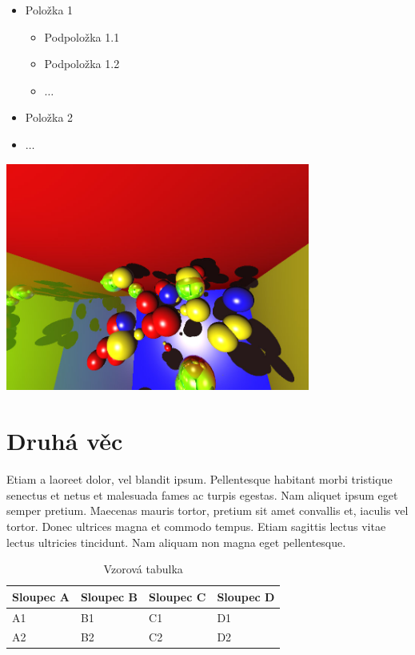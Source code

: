 \documentclass[12pt,a4paper,titlepage,final]{report}
\begin{document}
\begin{itemize}
	\item Položka 1
	\begin{itemize}
		\item Podpoložka 1.1
		\item Podpoložka 1.2
		\item $\ldots$
	\end{itemize}
	\item Položka 2
	\item $\ldots$
\end{itemize}

\begin{center}
	\captionsetup{type=figure}
		\includegraphics[width=10cm]{images/sample.jpg}
\end{center}

\section{Druhá věc}

Etiam a laoreet dolor, vel blandit ipsum. Pellentesque habitant morbi tristique senectus et netus et malesuada fames ac turpis egestas. Nam aliquet ipsum eget semper pretium. Maecenas mauris tortor, pretium sit amet convallis et, iaculis vel tortor. Donec ultrices magna et commodo tempus. Etiam sagittis lectus vitae lectus ultricies tincidunt. Nam aliquam non magna eget pellentesque. 

\begin{table}[h!]
	\begin{center}
    \begin{tabular}{ | p{3.5cm} | p{3.5cm} | p{3.5cm} | p{3.5cm} |}
    \hline
    Sloupec A & Sloupec B & Sloupec C & Sloupec D
    \\ \hline
    
	A1 & B1 & C1 & D1
	\\ \hline
	
	A2 & B2 & C2 & D2
	\\ \hline
	
    \end{tabular}
	\end{center}	
	\caption{Vzorová tabulka}  
\end{table}
\end{document}
